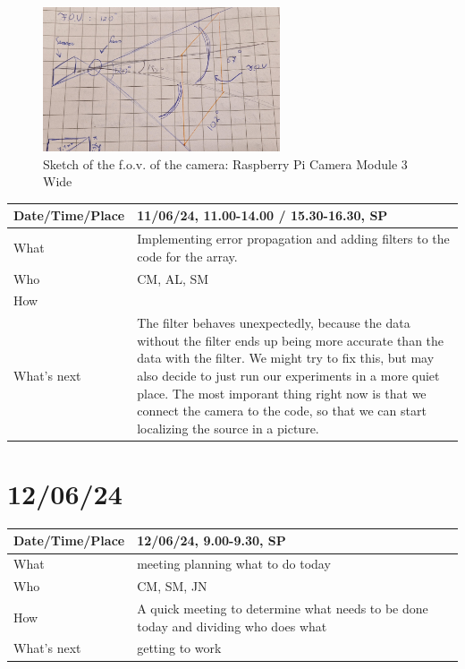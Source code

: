 \documentclass{article}
\begin{document}
\begin{figure}[H]
    \centering
    \includegraphics[width=7cm]{Foto tekening sensor en F.O.V..jpg}
    \caption{Sketch of the f.o.v. of the camera: Raspberry Pi Camera Module 3 Wide}   
\end{figure}


\begin{table}[H]
\begin{tabular}{|p{1.5in}|p{4in}|}
\hline
Date/Time/Place & 11/06/24, 11.00-14.00 / 15.30-16.30, SP \\ \hline
What            & Implementing error propagation and adding filters to the code for the array. \\ \hline
Who             & CM, AL, SM \\ \hline
How             &  \\ \hline
What's next     & The filter behaves unexpectedly, because the data without the filter ends up being more accurate than the data with the filter. We might try to fix this, but may also decide to just run our experiments in a more quiet place. The most imporant thing right now is that we connect the camera to the code, so that we can start localizing the source in a picture.\\ \hline
\end{tabular}
\end{table}

\section{12/06/24}

\begin{table}[H]
\begin{tabular}{|p{1.5in}|p{4in}|}
\hline
Date/Time/Place & 12/06/24, 9.00-9.30, SP \\ \hline
What            & meeting planning what to do today \\ \hline
Who             & CM, SM, JN \\ \hline
How             & A quick meeting to determine what needs to be done today and dividing who does what \\ \hline
What's next     &  getting to work\\ \hline
\end{tabular}
\end{table}
\end{document}
